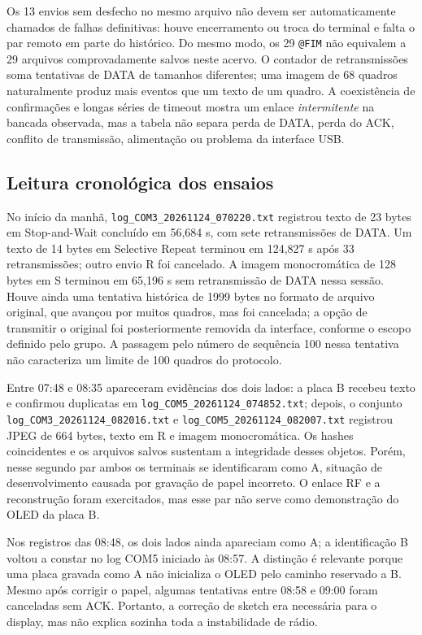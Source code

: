 \documentclass[12pt,a4paper]{article}
\begin{document}
Os 13 envios sem desfecho no mesmo arquivo não devem ser automaticamente chamados de falhas definitivas: houve encerramento ou troca do terminal e falta o par remoto em parte do histórico. Do mesmo modo, os 29 \texttt{@FIM} não equivalem a 29 arquivos comprovadamente salvos neste acervo. O contador de retransmissões soma tentativas de DATA de tamanhos diferentes; uma imagem de 68 quadros naturalmente produz mais eventos que um texto de um quadro. A coexistência de confirmações e longas séries de timeout mostra um enlace \emph{intermitente} na bancada observada, mas a tabela não separa perda de DATA, perda do ACK, conflito de transmissão, alimentação ou problema da interface USB.

\subsection{Leitura cronológica dos ensaios}
No início da manhã, \texttt{log\_COM3\_20261124\_070220.txt} registrou texto de 23 bytes em Stop-and-Wait concluído em 56,684 s, com sete retransmissões de DATA. Um texto de 14 bytes em Selective Repeat terminou em 124,827 s após 33 retransmissões; outro envio R foi cancelado. A imagem monocromática de 128 bytes em S terminou em 65,196 s sem retransmissão de DATA nessa sessão. Houve ainda uma tentativa histórica de 1999 bytes no formato de arquivo original, que avançou por muitos quadros, mas foi cancelada; a opção de transmitir o original foi posteriormente removida da interface, conforme o escopo definido pelo grupo. A passagem pelo número de sequência 100 nessa tentativa não caracteriza um limite de 100 quadros do protocolo.

Entre 07:48 e 08:35 apareceram evidências dos dois lados: a placa B recebeu texto e confirmou duplicatas em \texttt{log\_COM5\_20261124\_074852.txt}; depois, o conjunto \texttt{log\_COM3\_20261124\_082016.txt} e \texttt{log\_COM5\_20261124\_082007.txt} registrou JPEG de 664 bytes, texto em R e imagem monocromática. Os hashes coincidentes e os arquivos salvos sustentam a integridade desses objetos. Porém, nesse segundo par ambos os terminais se identificaram como A, situação de desenvolvimento causada por gravação de papel incorreto. O enlace RF e a reconstrução foram exercitados, mas esse par não serve como demonstração do OLED da placa B.

Nos registros das 08:48, os dois lados ainda apareciam como A; a identificação B voltou a constar no log COM5 iniciado às 08:57. A distinção é relevante porque uma placa gravada como A não inicializa o OLED pelo caminho reservado a B. Mesmo após corrigir o papel, algumas tentativas entre 08:58 e 09:00 foram canceladas sem ACK. Portanto, a correção de sketch era necessária para o display, mas não explica sozinha toda a instabilidade de rádio.
\end{document}
